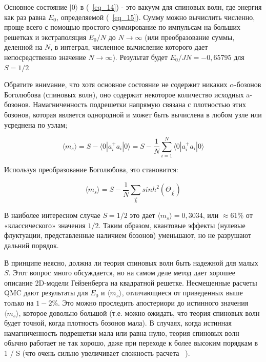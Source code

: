 \documentclass[11pt]{article}
\begin{document}
Основное состояние  $|0\rangle$ в (~\ref{eq_14}) - это вакуум для спиновых волн, где энергия как раз равна $E_0$, определяемой (~\ref{eq_15}). Сумму можно вычислить численно, проще всего с помощью простого суммирование по импульсам на больших решетках и экстраполяция $E_0/N$ до $N \to \infty$ (или преобразование суммы, деленной на $N$, в интеграл, численное вычисление которого дает непосредственно значение $N \to \infty$). Результат будет $E_0/JN=-0,65795$ для $S=1/2$

Обратите внимание, что хотя основное состояние не содержит никаких $\alpha$-бозонов Боголюбова (спиновых волн), оно содержит некоторое количество исходных a-бозонов. Намагниченность подрешетки напрямую связана с плотностью этих бозонов, которая является однородной и может быть вычислена в любом узле или усреднена по узлам;

\begin{equation}
\langle m_s \rangle = S-\langle 0|a_i^{+}a_i|0 \rangle = S-\frac{1}{N}\sum\limits_{i=1}^N \langle 0|a_i^{+}a_i|0 \rangle
\label{eq_17}
\end{equation}

Используя преобразование Боголюбова, это становится:

\begin{equation}
\langle m_s \rangle = S-\frac{1}{N}\sum\limits_{\vec{k}} sinh^2(\Theta_{\vec{k}})
\label{eq_17}
\end{equation}

В наиболее интересном случае $S = 1/2$ это дает $\langle m_s \rangle = 0,3034$, или $\approx 61\%$ от «классического» значения $1/2$. Таким образом, квантовые эффекты (нулевые флуктуации, представленные наличием бозонов) уменьшают, но не разрушают дальний порядок.

В принципе неясно, должна ли теория спиновых волн быть надежной для малых $S$.
Этот вопрос много обсуждается, но на самом деле метод дает хорошее описание 2D-модели Гейзенберга на квадратной решетке. Несмещенные расчеты QMC дают результаты для $E_0$ и $\langle m_s \rangle$, отличающиеся от приведенных выше только на $1-2\%$. Это можно проследить апостериори до истинного значения $\langle m_s \rangle$, которое довольно большой (т.е. можно ожидать, что теория спиновых волн будет точной, когда плотность бозонов мала). В случаях, когда истинная намагниченность подрешетки мала или равна нулю, теория спиновых волн обычно работает не так хорошо, даже при переходе к более высоким порядкам в
1 / S (что очень сильно увеличивает сложность расчета ~\cite{prb_45_7127,prb_46_6276,prb_46_1_10763}).
\end{document}
